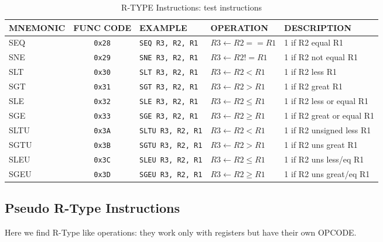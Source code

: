 \begin{table}[H]
\begin{tabularx}{\textwidth}{|l|c|l|l|X|}
    \hline
    MNEMONIC & FUNC CODE & EXAMPLE & OPERATION & DESCRIPTION \\ 
    \hline
    SEQ & \texttt{0x28} & \texttt{SEQ R3, R2, R1} & $R3 \leftarrow R2 == R1$ & 1 if R2 equal R1\\ 
    \hline
    SNE & \texttt{0x29} & \texttt{SNE R3, R2, R1} & $R3 \leftarrow R2 != R1$ & 1 if R2 not equal R1\\ 
    \hline
    SLT & \texttt{0x30} & \texttt{SLT R3, R2, R1} & $R3 \leftarrow R2 < R1$ & 1 if R2 less R1\\ 
    \hline
    SGT & \texttt{0x31} & \texttt{SGT R3, R2, R1} & $R3 \leftarrow R2 > R1$ & 1 if R2 great R1\\ 
    \hline
    SLE & \texttt{0x32} & \texttt{SLE R3, R2, R1} & $R3 \leftarrow R2 \leq R1$ & 1 if R2 less or equal R1\\ 
    \hline
    SGE & \texttt{0x33} & \texttt{SGE R3, R2, R1} & $R3 \leftarrow R2 \geq R1$ & 1 if R2 great or equal R1\\ 
    \hline
    SLTU & \texttt{0x3A} & \texttt{SLTU R3, R2, R1} & $R3 \leftarrow R2 < R1$ & 1 if R2 unsigned less R1\\ 
    \hline
    SGTU & \texttt{0x3B} & \texttt{SGTU R3, R2, R1} & $R3 \leftarrow R2 > R1$ & 1 if R2 uns great R1\\ 
    \hline
    SLEU & \texttt{0x3C} & \texttt{SLEU R3, R2, R1} & $R3 \leftarrow R2 \leq R1$ & 1 if R2 uns less/eq R1\\ 
    \hline
    SGEU & \texttt{0x3D} & \texttt{SGEU R3, R2, R1} & $R3 \leftarrow R2 \geq R1$ & 1 if R2 uns great/eq R1\\ 
    \hline
\end{tabularx}
\caption{R-TYPE Instructions: test instructions}
\label{table:r_type_test}
\end{table}

\subsection{Pseudo R-Type Instructions}

Here we find R-Type like operations: they work only with registers but have their own OPCODE.

